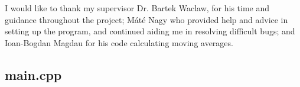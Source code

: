 \documentclass[a4paper,12pt]{article}
\begin{document}
	I would like to thank my supervisor Dr. Bartek Waclaw, for his time and guidance throughout the project; Máté Nagy who provided help and advice in setting up the program, and continued aiding me in resolving difficult bugs; and Ioan-Bogdan Magdau for his code calculating moving averages. 

	
	



\lstset{basicstyle=\tiny,style=myCustomMatlabStyle}
\begin{appendices}
	\appendix
	
	\section{main.cpp}
	\label{sec:elso_appendix}
\inputminted[fontsize=\scriptsize,linenos,breaklines,breakanywhere]{c++}{../reading_in/main.cpp}

\inputminted[fontsize=\scriptsize,linenos,breaklines,breakanywhere]{c++}{../reading_in/cell.h}
\inputminted[fontsize=\scriptsize,linenos,breaklines,breakanywhere]{c++}{../reading_in/cell.cpp}
\inputminted[fontsize=\scriptsize,linenos,breaklines,breakanywhere]{c++}{../reading_in/reaction.h}
\inputminted[fontsize=\scriptsize,linenos,breaklines,breakanywhere]{c++}{../reading_in/reaction.cpp}
\end{appendices}
\end{document}
